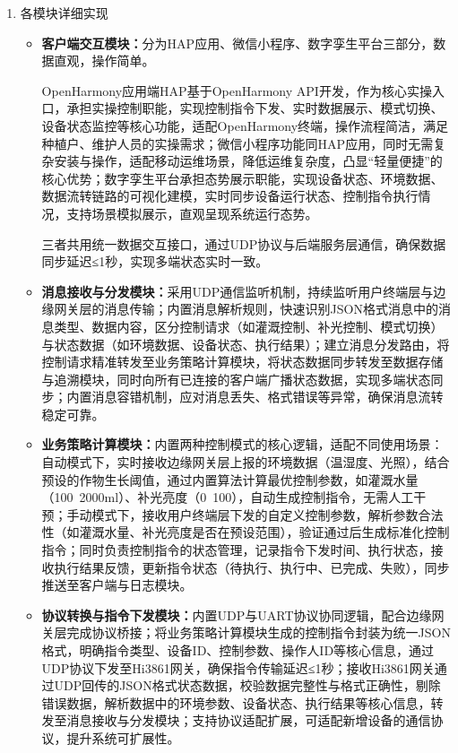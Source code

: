 \documentclass{article}
\begin{document}
\begin{enumerate}
    \item 各模块详细实现
    \begin{itemize}[leftmargin=2em,itemsep=0.2em,topsep=0.2em]
        \item \textbf{客户端交互模块：}分为HAP应用、微信小程序、数字孪生平台三部分，数据直观，操作简单。

        OpenHarmony应用端HAP基于OpenHarmony API开发，作为核心实操入口，承担实操控制职能，实现控制指令下发、实时数据展示、模式切换、设备状态监控等核心功能，适配OpenHarmony终端，操作流程简洁，满足种植户、维护人员的实操需求；微信小程序功能同HAP应用，同时无需复杂安装与操作，适配移动运维场景，降低运维复杂度，凸显“轻量便捷”的核心优势；数字孪生平台承担态势展示职能，实现设备状态、环境数据、数据流转链路的可视化建模，实时同步设备运行状态、控制指令执行情况，支持场景模拟展示，直观呈现系统运行态势。
        
        三者共用统一数据交互接口，通过UDP协议与后端服务层通信，确保数据同步延迟≤1秒，实现多端状态实时一致。

        \item \textbf{消息接收与分发模块：}采用UDP通信监听机制，持续监听用户终端层与边缘网关层的消息传输；内置消息解析规则，快速识别JSON格式消息中的消息类型、数据内容，区分控制请求（如灌溉控制、补光控制、模式切换）与状态数据（如环境数据、设备状态、执行结果）；建立消息分发路由，将控制请求精准转发至业务策略计算模块，将状态数据同步转发至数据存储与追溯模块，同时向所有已连接的客户端广播状态数据，实现多端状态同步；内置消息容错机制，应对消息丢失、格式错误等异常，确保消息流转稳定可靠。

        \item \textbf{业务策略计算模块：}内置两种控制模式的核心逻辑，适配不同使用场景：自动模式下，实时接收边缘网关层上报的环境数据（温湿度、光照），结合预设的作物生长阈值，通过内置算法计算最优控制参数，如灌溉水量（100~2000ml）、补光亮度（0~100），自动生成控制指令，无需人工干预；手动模式下，接收用户终端层下发的自定义控制参数，解析参数合法性（如灌溉水量、补光亮度是否在预设范围），验证通过后生成标准化控制指令；同时负责控制指令的状态管理，记录指令下发时间、执行状态，接收执行结果反馈，更新指令状态（待执行、执行中、已完成、失败），同步推送至客户端与日志模块。

        \item \textbf{协议转换与指令下发模块：}内置UDP与UART协议协同逻辑，配合边缘网关层完成协议桥接；将业务策略计算模块生成的控制指令封装为统一JSON格式，明确指令类型、设备ID、控制参数、操作人ID等核心信息，通过UDP协议下发至Hi3861网关，确保指令传输延迟≤1秒；接收Hi3861网关通过UDP回传的JSON格式状态数据，校验数据完整性与格式正确性，剔除错误数据，解析数据中的环境参数、设备状态、执行结果等核心信息，转发至消息接收与分发模块；支持协议适配扩展，可适配新增设备的通信协议，提升系统可扩展性。


\end{itemize}
\end{enumerate}
\end{document}
